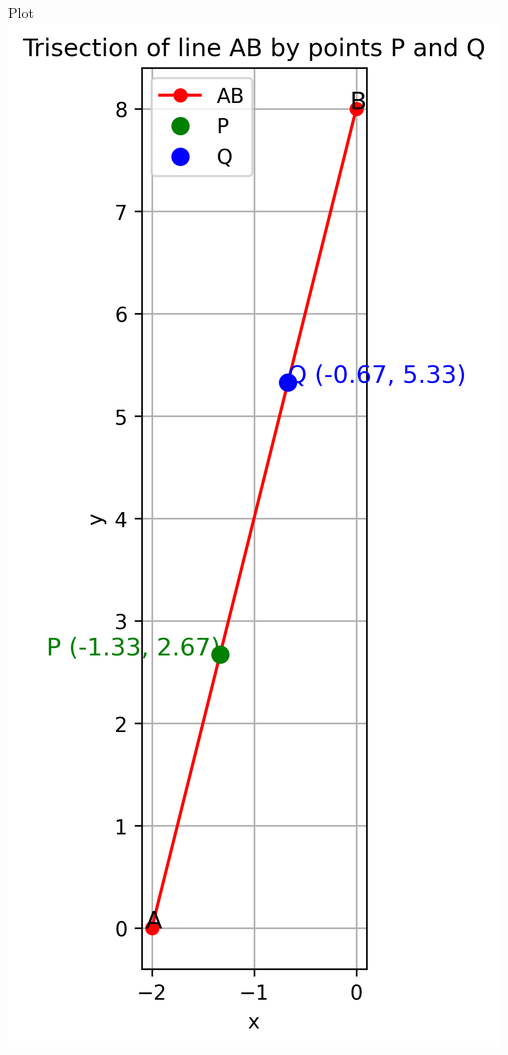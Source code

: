 \documentclass{beamer}
\begin{document}
\begin{frame}{Plot}
    \centering
    \includegraphics[width=\columnwidth, height=0.8\textheight, keepaspectratio]{figs/Figure_1.png}     
\end{frame}
\end{document}
